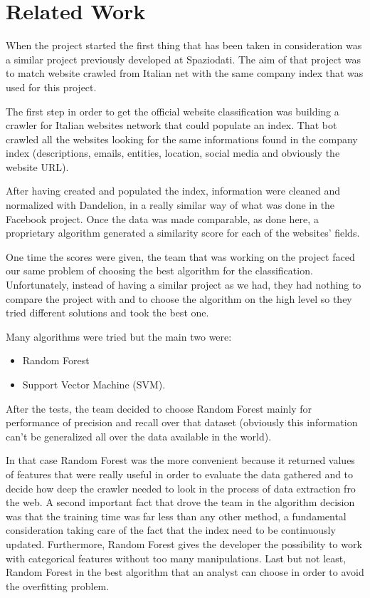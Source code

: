 \chapter{Related Work} 

When the project started the first thing that has been taken in consideration was a similar project previously developed at Spaziodati. The aim of that project was to match website crawled from Italian net with the same company index that was used for this project.

The first step in order to get the official website classification was building a crawler for Italian websites network that could populate an index. That bot crawled all the websites looking for the same informations found in the company index (descriptions, emails, entities, location, social media and obviously the website URL).

After having created and populated the index, information were cleaned and normalized with Dandelion, in a really similar way of what was done in the Facebook project. Once the data was made comparable, as done here, a proprietary algorithm generated a similarity score for each of the websites' fields.

One time the scores were given, the team that was working on the project faced our same problem of choosing the best algorithm for the classification. Unfortunately, instead of having a similar project as we had, they had nothing to compare the project with and to choose the algorithm on the high level so they tried different solutions and took the best one.

Many algorithms were tried but the main two were:
\begin{itemize}
\item Random Forest
\item Support Vector Machine (SVM).
\end{itemize}

After the tests, the team decided to choose Random Forest mainly for performance of precision and recall over that dataset (obviously this information can't be generalized all over the data available in the world).

In that case Random Forest was the more convenient because it returned values of features that were really useful in order to evaluate the data gathered and to decide how deep the crawler needed to look in the process of data extraction fro the web.
A second important fact that drove the team in the algorithm decision was that the training time was far less than any other method, a fundamental consideration taking care of the fact that the index need to be continuously updated. Furthermore, Random Forest gives the developer the possibility to work with categorical features without too many manipulations. 
Last but not least, Random Forest in the best algorithm that an analyst can choose in order to avoid the overfitting problem.


